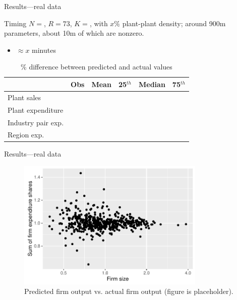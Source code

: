 \documentclass[12pt]{beamer}
\begin{document}
\begin{frame}{Results---real data}

\begin{block}{Timing}
$N = $, $R=73$, $K=$, with $x\%$ plant-plant density; around 900m parameters, about 10m of which are nonzero.
\begin{itemize}
\item $\approx x$ minutes
\end{itemize}
\end{block}

\begin{table}[]
\centering
\footnotesize
\caption{\% difference between predicted and actual values}
\label{my-label}
\begin{tabular}{l rrrrr}
\toprule
                          & Obs & Mean &  25$^{th}$ & Median & 75$^{th}$ \\
\midrule                          
Plant sales                 	&		&		&		&		&		                 \\
Plant expenditure           	&		&		&		&		&		                \\
Industry pair exp. 	&		&		&		&		&		                 \\
Region exp.         	&		&		&		&		&		                 \\
	\bottomrule
\end{tabular}
\end{table}

\end{frame}

\begin{frame}{Results---real data}

\begin{figure}[h]
\caption{Predicted firm output vs. actual firm output (figure is placeholder).}
\centering
\includegraphics[width=0.8\textwidth]{size-share-plot}
\end{figure}

\end{frame}
\end{document}
